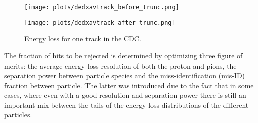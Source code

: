 \begin{figure}[h]
    \centering
    \begin{minipage}{18pc}
        \texttt{[image: plots/dedxavtrack\_before\_trunc.png]}
    \end{minipage}\hspace{3pc}%
    \begin{minipage}{18pc}
        \texttt{[image: plots/dedxavtrack\_after\_trunc.png]}
    \end{minipage}
    \caption{\label{fig.3.3} Energy loss for one track in the CDC.}
\end{figure}
The fraction of hits to be rejected is determined by optimizing three figure of merits: the average energy loss resolution of both the proton and pions, the separation power between particle species and the miss-identification (mis-ID) fraction between particle. The latter was introduced due to the fact that in some cases, where even with a good resolution and separation power there is still an important mix between the tails of the energy loss distributions of the different particles.

